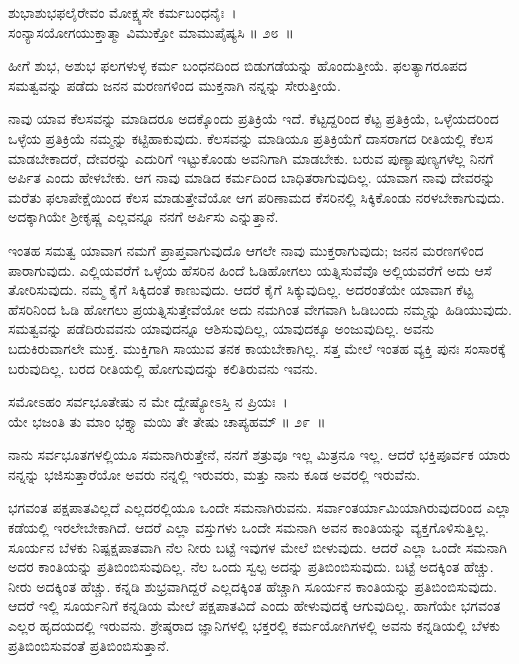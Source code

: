\begin{shloka}
ಶುಭಾಶುಭಫಲೈರೇವಂ ಮೋಕ್ಷ್ಯಸೇ ಕರ್ಮಬಂಧನೈಃ~।\\ಸಂನ್ಯಾಸಯೋಗಯುಕ್ತಾತ್ಮಾ ವಿಮುಕ್ತೋ ಮಾಮುಪೈಷ್ಯಸಿ \hfill॥ ೨೮~॥
\end{shloka}

\begin{artha}
ಹೀಗೆ ಶುಭ, ಅಶುಭ ಫಲಗಳುಳ್ಳ ಕರ್ಮ ಬಂಧನದಿಂದ ಬಿಡುಗಡೆಯನ್ನು ಹೊಂದುತ್ತೀಯೆ. ಫಲತ್ಯಾಗರೂಪದ ಸಮತ್ವವನ್ನು ಪಡೆದು ಜನನ ಮರಣಗಳಿಂದ ಮುಕ್ತನಾಗಿ ನನ್ನನ್ನು ಸೇರುತ್ತೀಯೆ.
\end{artha}

ನಾವು ಯಾವ ಕೆಲಸವನ್ನು ಮಾಡಿದರೂ ಅದಕ್ಕೊಂದು ಪ್ರತಿಕ್ರಿಯೆ ಇದೆ. ಕೆಟ್ಟದ್ದರಿಂದ ಕೆಟ್ಟ ಪ್ರತಿಕ್ರಿಯೆ, ಒಳ್ಳೆಯದರಿಂದ ಒಳ್ಳೆಯ ಪ್ರತಿಕ್ರಿಯೆ ನಮ್ಮನ್ನು ಕಟ್ಟಿಹಾಕುವುದು. ಕೆಲಸವನ್ನು ಮಾಡಿಯೂ ಪ್ರತಿಕ್ರಿಯೆಗೆ ದಾಸರಾಗದ ರೀತಿಯಲ್ಲಿ ಕೆಲಸ ಮಾಡಬೇಕಾದರೆ, ದೇವರನ್ನು ಎದುರಿಗೆ ಇಟ್ಟುಕೊಂಡು ಅವನಿಗಾಗಿ ಮಾಡಬೇಕು. ಬರುವ ಪುಣ್ಯಾಪುಣ್ಯಗಳೆಲ್ಲ ನಿನಗೆ ಅರ್ಪಿತ ಎಂದು ಹೇಳಬೇಕು. ಆಗ ನಾವು ಮಾಡಿದ ಕರ್ಮದಿಂದ ಬಾಧಿತರಾಗುವುದಿಲ್ಲ. ಯಾವಾಗ ನಾವು ದೇವರನ್ನು ಮರೆತು ಫಲಾಪೇಕ್ಷೆಯಿಂದ ಕೆಲಸ ಮಾಡುತ್ತೇವೆಯೋ ಆಗ ಪರಿಣಾಮದ ಕೆಸರಿನಲ್ಲಿ ಸಿಕ್ಕಿಕೊಂಡು ನರಳಬೇಕಾಗುವುದು. ಅದಕ್ಕಾಗಿಯೇ ಶ‍್ರೀಕೃಷ್ಣ ಎಲ್ಲವನ್ನೂ ನನಗೆ ಅರ್ಪಿಸು ಎನ್ನುತ್ತಾನೆ.

ಇಂತಹ ಸಮತ್ವ ಯಾವಾಗ ನಮಗೆ ಪ್ರಾಪ್ತವಾಗುವುದೊ ಆಗಲೇ ನಾವು ಮುಕ್ತರಾಗುವುದು; ಜನನ ಮರಣಗಳಿಂದ ಪಾರಾಗುವುದು. ಎಲ್ಲಿಯವರೆಗೆ ಒಳ್ಳೆಯ ಹೆಸರಿನ ಹಿಂದೆ ಓಡಿಹೋಗಲು ಯತ್ನಿಸುವೆವೊ ಅಲ್ಲಿಯವರೆಗೆ ಅದು ಆಸೆ ತೋರಿಸುವುದು. ನಮ್ಮ ಕೈಗೆ ಸಿಕ್ಕಿದಂತೆ ಕಾಣುವುದು. ಆದರೆ ಕೈಗೆ ಸಿಕ್ಕುವುದಿಲ್ಲ. ಅದರಂತೆಯೇ ಯಾವಾಗ ಕೆಟ್ಟ ಹೆಸರಿನಿಂದ ಓಡಿ ಹೋಗಲು ಪ್ರಯತ್ನಿಸುತ್ತೇವೆಯೋ ಅದು ನಮಗಿಂತ ವೇಗವಾಗಿ ಓಡಿಬಂದು ನಮ್ಮನ್ನು ಹಿಡಿಯುವುದು. ಸಮತ್ವವನ್ನು ಪಡೆದಿರುವವನು ಯಾವುದನ್ನೂ ಆಶಿಸುವುದಿಲ್ಲ, ಯಾವುದಕ್ಕೂ ಅಂಜುವುದಿಲ್ಲ. ಅವನು ಬದುಕಿರುವಾಗಲೇ ಮುಕ್ತ. ಮುಕ್ತಿಗಾಗಿ ಸಾಯುವ ತನಕ ಕಾಯಬೇಕಾಗಿಲ್ಲ. ಸತ್ತ ಮೇಲೆ ಇಂತಹ ವ್ಯಕ್ತಿ ಪುನಃ ಸಂಸಾರಕ್ಕೆ ಬರುವುದಿಲ್ಲ. ಬರದ ರೀತಿಯಲ್ಲಿ ಹೋಗುವುದನ್ನು ಕಲಿತಿರುವನು ಇವನು.

\begin{shloka}
ಸಮೋಽಹಂ ಸರ್ವಭೂತೇಷು ನ ಮೇ ದ್ವೇಷ್ಯೋಽಸ್ತಿ ನ ಪ್ರಿಯಃ~।\\ಯೇ ಭಜಂತಿ ತು ಮಾಂ ಭಕ್ತ್ಯಾ ಮಯಿ ತೇ ತೇಷು ಚಾಪ್ಯಹಮ್ \hfill॥ ೨೯~॥
\end{shloka}

\begin{artha}
ನಾನು ಸರ್ವಭೂತಗಳಲ್ಲಿಯೂ ಸಮನಾಗಿರುತ್ತೇನೆ, ನನಗೆ ಶತ್ರುವೂ ಇಲ್ಲ ಮಿತ್ರನೂ ಇಲ್ಲ. ಆದರೆ ಭಕ್ತಿಪೂರ್ವಕ ಯಾರು ನನ್ನನ್ನು ಭಜಿಸುತ್ತಾರೆಯೋ ಅವರು ನನ್ನಲ್ಲಿ ಇರುವರು, ಮತ್ತು ನಾನು ಕೂಡ ಅವರಲ್ಲಿ ಇರುವೆನು.
\end{artha}

ಭಗವಂತ ಪಕ್ಷಪಾತವಿಲ್ಲದೆ ಎಲ್ಲದರಲ್ಲಿಯೂ ಒಂದೇ ಸಮನಾಗಿರುವನು. ಸರ್ವಾಂತ\-ರ್ಯಾಮಿ\-ಯಾಗಿರುವುದರಿಂದ ಎಲ್ಲಾ ಕಡೆಯಲ್ಲಿ ಇರಲೇಬೇಕಾಗಿದೆ. ಆದರೆ ಎಲ್ಲಾ ವಸ್ತುಗಳು ಒಂದೇ ಸಮನಾಗಿ ಅವನ ಕಾಂತಿಯನ್ನು ವ್ಯಕ್ತಗೊಳಿಸುತ್ತಿಲ್ಲ. ಸೂರ್ಯನ ಬೆಳಕು ನಿಷ್ಪಕ್ಷಪಾತವಾಗಿ ನೆಲ ನೀರು ಬಟ್ಟೆ ಇವುಗಳ ಮೇಲೆ ಬೀಳುವುದು. ಆದರೆ ಎಲ್ಲಾ ಒಂದೇ ಸಮನಾಗಿ ಅದರ ಕಾಂತಿಯನ್ನು ಪ್ರತಿಬಿಂಬಿಸುವುದಿಲ್ಲ. ನೆಲ ಒಂದು ಸ್ವಲ್ಪ ಅದನ್ನು ಪ್ರತಿಬಿಂಬಿಸುವುದು. ಬಟ್ಟೆ ಅದಕ್ಕಿಂತ ಹೆಚ್ಚು. ನೀರು ಅದಕ್ಕಿಂತ ಹೆಚ್ಚು. ಕನ್ನಡಿ ಶುಭ್ರವಾಗಿದ್ದರೆ ಎಲ್ಲದಕ್ಕಿಂತ ಹೆಚ್ಚಾಗಿ ಸೂರ್ಯನ ಕಾಂತಿಯನ್ನು ಪ್ರತಿಬಿಂಬಿಸುವುದು. ಆದರೆ ಇಲ್ಲಿ ಸೂರ್ಯನಿಗೆ ಕನ್ನಡಿಯ ಮೇಲೆ ಪಕ್ಷಪಾತವಿದೆ ಎಂದು ಹೇಳುವುದಕ್ಕೆ ಆಗುವುದಿಲ್ಲ. ಹಾಗೆಯೇ ಭಗವಂತ ಎಲ್ಲರ ಹೃದಯದಲ್ಲಿ ಇರುವನು. ಶ್ರೇಷ್ಠರಾದ ಜ್ಞಾನಿಗಳಲ್ಲಿ ಭಕ್ತರಲ್ಲಿ ಕರ್ಮಯೋಗಿಗಳಲ್ಲಿ ಅವನು ಕನ್ನಡಿಯಲ್ಲಿ ಬೆಳಕು ಪ್ರತಿಬಿಂಬಿಸುವಂತೆ ಪ್ರತಿಬಿಂಬಿಸುತ್ತಾನೆ.

